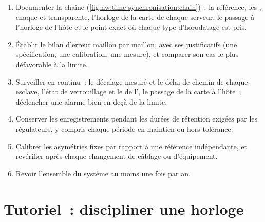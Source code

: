 \begin{method}\label{met:nw:time-synchronisation:prove}
\begin{enumerate}
\item Documenter la chaîne (\cref{fig:nw:time-synchronisation:chain})~: la référence, les , chaque  et transparente, l'horloge
  de la carte de chaque serveur, le passage à l'horloge de l'hôte et le point exact où chaque type d'horodatage est pris.
\item Établir le bilan d'erreur maillon par maillon, avec ses justificatifs (une spécification, une calibration, une mesure), et comparer son cas le plus
  défavorable à la limite.
\item Surveiller en continu~: le décalage mesuré et le délai de chemin de chaque esclave, l'état de verrouillage et le  de l', le passage de la carte à l'hôte~;
  déclencher une alarme bien en deçà de la limite.
\item Conserver les enregistrements pendant les durées de rétention exigées par les régulateurs, y compris chaque période en maintien ou hors tolérance.
\item Calibrer les asymétries fixes par rapport à une référence indépendante, et revérifier après chaque changement de câblage ou d'équipement.
\item Revoir l'ensemble du système au moins une fois par an.
\end{enumerate}
\end{method}

\section{Tutoriel~: discipliner une horloge}\label{tut:nw:time-synchronisation:tut}

